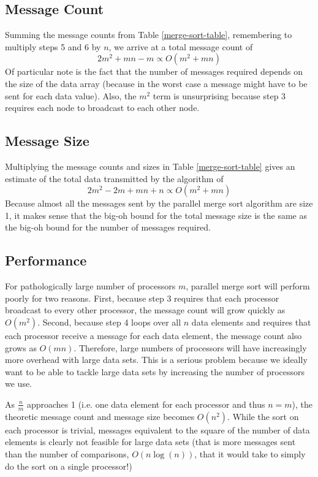 \documentclass[10pt]{article}
\begin{document}

\subsection{Message Count}
Summing the message counts from Table \ref{merge-sort-table}, remembering to multiply steps 5 and 6 by \(n\), we arrive at a total message count of \[2m^2+mn-m \propto O(m^2+mn)\] Of particular note is the fact that the number of messages required depends on the size of the data array (because in the worst case a message might have to be sent for each data value). Also, the \(m^2\) term is unsurprising because step 3 requires each node to broadcast to each other node.

\subsection{Message Size}
Multiplying the message counts and sizes in Table \ref{merge-sort-table} gives an estimate of the total data transmitted by the algorithm of \[2m^2-2m+mn+n \propto O(m^2+mn)\] Because almost all the messages sent by the parallel merge sort algorithm are size 1, it makes sense that the big-oh bound for the total message size is the same as the big-oh bound for the number of messages required.

\subsection{Performance}
For pathologically large number of processors \(m\), parallel merge sort will perform poorly for two reasons. First, because step 3 requires that each processor broadcast to every other processor, the message count will grow quickly as \(O(m^2)\). Second, because step 4 loops over all \(n\) data elements and requires that each processor receive a message for each data element, the message count also grows as \(O(mn)\). Therefore, large numbers of processors will have increasingly more overhead with large data sets. This is a serious problem because we ideally want to be able to tackle large data sets by increasing the number of processors we use.

As \(\frac{n}{m}\) approaches 1 (i.e. one data element for each processor and thus \(n=m\)), the theoretic message count and message size becomes \(O(n^2)\). While the sort on each processor is trivial, messages equivalent to the square of the number of data elements is clearly not feasible for large data sets (that is more messages sent than the number of comparisons, \(O(n\log(n))\), that it would take to simply do the sort on a single processor!)
\end{document}
